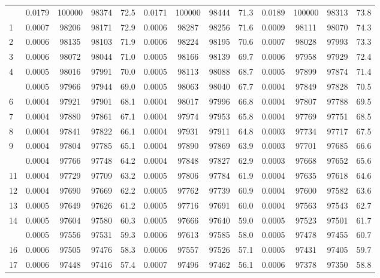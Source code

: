 \documentclass[
  14pt,
]{article}
\begin{document}
\begin{longtable}[t]{lcccccccccccc}
\endfoot
\bottomrule
\endlastfoot
0 & 0.0179 & 100000 & 98374 & 72.5 & 0.0171 & 100000 & 98444 & 71.3 & 0.0189 & 100000 & 98313 & 73.8\\
1 & 0.0007 & 98206 & 98171 & 72.9 & 0.0006 & 98287 & 98256 & 71.6 & 0.0009 & 98111 & 98070 & 74.3\\
2 & 0.0006 & 98135 & 98103 & 71.9 & 0.0006 & 98224 & 98195 & 70.6 & 0.0007 & 98028 & 97993 & 73.3\\
3 & 0.0006 & 98072 & 98044 & 71.0 & 0.0005 & 98166 & 98139 & 69.7 & 0.0006 & 97958 & 97929 & 72.4\\
4 & 0.0005 & 98016 & 97991 & 70.0 & 0.0005 & 98113 & 98088 & 68.7 & 0.0005 & 97899 & 97874 & 71.4\\
\addlinespace
5 & 0.0005 & 97966 & 97944 & 69.0 & 0.0005 & 98063 & 98040 & 67.7 & 0.0004 & 97849 & 97828 & 70.5\\
6 & 0.0004 & 97921 & 97901 & 68.1 & 0.0004 & 98017 & 97996 & 66.8 & 0.0004 & 97807 & 97788 & 69.5\\
7 & 0.0004 & 97880 & 97861 & 67.1 & 0.0004 & 97974 & 97953 & 65.8 & 0.0004 & 97769 & 97751 & 68.5\\
8 & 0.0004 & 97841 & 97822 & 66.1 & 0.0004 & 97931 & 97911 & 64.8 & 0.0003 & 97734 & 97717 & 67.5\\
9 & 0.0004 & 97804 & 97785 & 65.1 & 0.0004 & 97890 & 97869 & 63.9 & 0.0003 & 97701 & 97685 & 66.6\\
\addlinespace
10 & 0.0004 & 97766 & 97748 & 64.2 & 0.0004 & 97848 & 97827 & 62.9 & 0.0003 & 97668 & 97652 & 65.6\\
11 & 0.0004 & 97729 & 97709 & 63.2 & 0.0005 & 97806 & 97784 & 61.9 & 0.0004 & 97635 & 97618 & 64.6\\
12 & 0.0004 & 97690 & 97669 & 62.2 & 0.0005 & 97762 & 97739 & 60.9 & 0.0004 & 97600 & 97582 & 63.6\\
13 & 0.0005 & 97649 & 97626 & 61.2 & 0.0005 & 97716 & 97691 & 60.0 & 0.0004 & 97563 & 97543 & 62.7\\
14 & 0.0005 & 97604 & 97580 & 60.3 & 0.0005 & 97666 & 97640 & 59.0 & 0.0005 & 97523 & 97501 & 61.7\\
\addlinespace
15 & 0.0005 & 97556 & 97531 & 59.3 & 0.0006 & 97613 & 97585 & 58.0 & 0.0005 & 97478 & 97455 & 60.7\\
16 & 0.0006 & 97505 & 97476 & 58.3 & 0.0006 & 97557 & 97526 & 57.1 & 0.0005 & 97431 & 97405 & 59.7\\
17 & 0.0006 & 97448 & 97416 & 57.4 & 0.0007 & 97496 & 97462 & 56.1 & 0.0006 & 97378 & 97350 & 58.8\\

\end{longtable}
\end{document}
